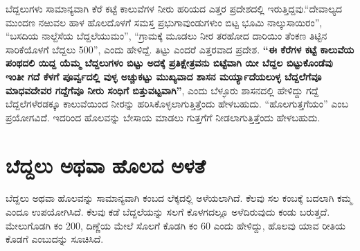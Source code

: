 ಬೆದ್ದಲುಗಳು ಸಾಮಾನ್ಯವಾಗಿ ಕೆರೆ ಕಟ್ಟೆ ಕಾಲುವೆಗಳ ನೀರು ಹರಿಯದ ಎತ್ತರ ಪ್ರದೇಶದಲ್ಲಿ ಇರುತ್ತಿದ್ದವು.\break “ದೇವಾಲ್ಯದ ಮುಂದಣ ನಱುವಲ ಹಾಳ ಹೊಲದೊಳಗೆ ಸಮಸ್ತ ಪ್ರಭುಗಾವುಂಡುಗಳುಂ ಬಿಟ್ಟ ಭೂಮಿ ನಾಲ್ಕುಸಾಯಿರಂ”, “ಬಸದಿಯ ನಾಲ್ದೆಸೆಯ ಬೆದ್ದಲೆಯುಮಂ”, “ಗ್ರಾಮಕ್ಕೆ ಮೂಡಲು ನೀರ ತರಹೋದ ದಾರಿಯಿಂ ತೆಂಕಣ ತಿಟ್ಟಿನ ಸಾರಿಕೆಯೊಳಗೆ ಬೆದ್ದಲು 500”, ಎಂದು ಹೇಳಿದ್ದೆ. ತಿಟ್ಟು ಎಂದರೆ ಎತ್ತರವಾದ ಪ್ರದೇಶ. \textbf{“ಈ ಕೆರೆಗಳ ಕಟ್ಟೆ ಕಾಲುವೆಯ ಪಂಥದಲಿ ಯಿದ್ದ ಯೆಮ್ಮ ಬೆದ್ದಲುಗಳಂ ಬಿಟ್ಟು ಅದಕ್ಕೆ ಪ್ರತಿಕ್ಷೇತ್ರವನು ಬಿಟ್ಟೆವಾಗಿ ಯೀ ಬೆದ್ದಲ ಬಿಟ್ಟುಕೊಂಡೆವು ಇಂತೀ ಗದೆ ಕೆಳಗೆ ಪೂರ್ವ್ವದಲ್ಲಿ ವುಳ್ಳ ಅಚ್ಚುಕಟ್ಟು ಮುಖ್ಯವಾದ ಶಾಸನ ಮರ್ಯ್ಯಾದೆಯಲುಳ್ಳ ಬೆದ್ದಲೆಗೆವೂ ಮಾಧವದೇವರ ಗದ್ದೆಗೆವೂ ನೀರು ಸಂಧಿಗೆ ಬಿತ್ತುವಟ್ಟವಾಗಿ”}, ಎಂದು ಬೆಳ್ಳೂರು ಶಾಸನದಲ್ಲಿ ಹೇಳಿದ್ದು ಗದ್ದೆ ಬೆದ್ದಲೆಗಳೆರಡಕ್ಕೂ ಕಾಲುವೆಯಿಂದ ನೀರನ್ನು ಹರಿಸಿಕೊಳ್ಳಲಾಗುತ್ತಿತ್ತೆಂದು ಹೇಳಬಹುದು. “ಹೊಲಗುತ್ತಗೆಯಂ” ಎಂಬ ಪ್ರಯೋಗವಿದೆ. ಇದರಿಂದ ಹೊಲವನ್ನು ಬೇಸಾಯ ಮಾಡಲು ಗುತ್ತಗೆಗೆ ನೀಡಲಾಗುತ್ತಿತ್ತೆಂದು ಹೇಳಬಹುದು.


\section{ಬೆದ್ದಲು ಅಥವಾ ಹೊಲದ ಅಳತೆ}

ಬೆದ್ದಲು ಅಥವಾ ಹೊಲವನ್ನು ಸಾಮಾನ್ಯವಾಗಿ ಕಂಬದ ಲೆಕ್ಕದಲ್ಲಿ ಅಳೆಯಲಾಗಿದೆ. ಕೆಲವು ಸಲ ಕಂಬಕ್ಕೆ ಬದಲಾಗಿ ಕಮ್ಮ ಎಂದೂ ಉಪಯೋಗಿಸಿದೆ. ಕೆಲವು ಕಡೆ ಬೆದ್ದಲೆಯನ್ನು ಸಲಗೆ ಕೊಳಗದಲ್ಲೂ ಅಳೆದಿರುವುದು ಕಂಡು ಬರುತ್ತದೆ. ಮೇಲುಗೊಡಗಿ ಕಂ 200, ದಿಣ್ಣೆಯ ಮೇಲೆ ಸೊಲಗೆ ಕೊಡಗಿ ಕಂ 60 ಎಂದು ಹೇಳಿದ್ದು, ಹೊಲವು ಯಾವ ರೀತಿಯ ಕೊಡಗೆ ಎಂಬುದನ್ನು ಸೂಚಿಸಿದೆ.

